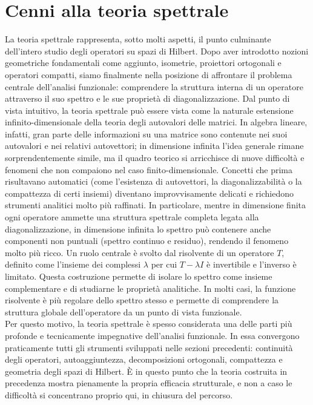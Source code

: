 \documentclass[a4paper,12pt]{report}
\begin{document}
\newpage

\section{Cenni alla teoria spettrale}

La teoria spettrale rappresenta, sotto molti aspetti, il punto culminante dell’intero studio degli operatori su spazi di Hilbert. Dopo aver introdotto nozioni geometriche fondamentali come aggiunto, isometrie, proiettori ortogonali e operatori compatti, siamo finalmente nella posizione di affrontare il problema centrale dell’analisi funzionale: comprendere la struttura interna di un operatore attraverso il suo spettro e le sue proprietà di diagonalizzazione. Dal punto di vista intuitivo, la teoria spettrale può essere vista come la naturale estensione infinito-dimensionale della teoria degli autovalori delle matrici. In algebra lineare, infatti, gran parte delle informazioni su una matrice sono contenute nei suoi autovalori e nei relativi autovettori; in dimensione infinita l’idea generale rimane sorprendentemente simile, ma il quadro teorico si arricchisce di nuove difficoltà e fenomeni che non compaiono nel caso finito-dimensionale. Concetti che prima risultavano automatici (come l’esistenza di autovettori, la diagonalizzabilità o la compattezza di certi insiemi) diventano improvvisamente delicati e richiedono strumenti analitici molto più raffinati. In particolare, mentre in dimensione finita ogni operatore ammette una struttura spettrale completa legata alla diagonalizzazione, in dimensione infinita lo spettro può contenere anche componenti non puntuali (spettro continuo e residuo), rendendo il fenomeno molto più ricco.
Un ruolo centrale è svolto dal risolvente di un operatore \(T\), definito come l’insieme dei complessi \(\lambda\) per cui \(T-\lambda I\) è invertibile e l’inverso è limitato. Questa costruzione permette di isolare lo spettro come insieme complementare e di studiarne le proprietà analitiche. In molti casi, la funzione risolvente è più regolare dello spettro stesso e permette di comprendere la struttura globale dell’operatore da un punto di vista funzionale.
\\Per questo motivo, la teoria spettrale è spesso considerata una delle parti più profonde e tecnicamente impegnative dell’analisi funzionale. In essa convergono praticamente tutti gli strumenti sviluppati nelle sezioni precedenti: continuità degli operatori, autoaggiuntezza, decomposizioni ortogonali, compattezza e geometria degli spazi di Hilbert. È in questo punto che la teoria costruita in precedenza mostra pienamente la propria efficacia strutturale, e non a caso le difficoltà si concentrano proprio qui, in chiusura del percorso.
\end{document}
